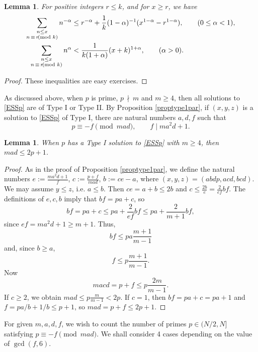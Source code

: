 \documentclass[12pt]{amsart}
\newtheorem{lemma}[theorem]{Lemma}
\theoremstyle{definition}
\theoremstyle{remark}
\numberwithin{equation}{section}
\begin{document}
\begin{lemma}
\label{lem3}
For positive integers $r\le k$, and for $x\ge r$, we have
\begin{align*}
\sum_{\substack{n\le x\\n\,\equiv\,r\kern-5pt\pmod k}}n^{-\alpha}
&\le r^{-\alpha}+\frac1k(1-\alpha)^{-1}(x^{1-\alpha}-r^{1-\alpha}), \qquad (0\le\alpha<1),\\
\sum_{\substack{n\le x\\n\,\equiv\,r\kern-5pt\pmod k}}n^\alpha
&<\frac1{k(1+\alpha)}(x+k)^{1+\alpha}, \qquad(\alpha>0).
\end{align*}

\end{lemma}
\begin{proof}
These  inequalities are easy exercises.
\end{proof}

As discussed above, when $p$ is prime, $p\,\nmid\, m$ and $m\ge 4$, then all solutions to \eqref{ESSp} 
are of Type I or Type II.  By Proposition \ref{proptype1par},  if $(x,y,z)$ is a solution to \eqref{ESSp} of Type I, there are natural numbers $a,d,f$ such that
$$
p\equiv -f \pmod{mad}, \qquad f\mid ma^2 d+1.
$$
\begin{lemma}\label{madub}
When $p$ has a Type I solution to \eqref{ESSp} with $m\ge4$, then $mad \le 2p+1$.
\end{lemma}
\begin{proof}
As in the proof of Proposition \ref{proptype1par}, we define the natural numbers
$e:=\frac{ma^2d+1}{f}$, $c:=\frac{p+f}{mad}$, $b:=ce-a$,
where
$
(x,y,z)=(abdp,acd,bcd).
$
We may assume $y\le z$, i.e. $a\le b$. Then $ce=a+b\le 2b$ and 
$c \le \frac{2b}{e} = \frac{2}{ef} bf$. 
The definitions of $e,c,b$ imply that $bf=pa+c$, so
$$ bf =pa+c \le pa +  \frac{2}{ef} bf \le pa + \frac{2}{m+1} bf,$$
since $ef=ma^2d+1\ge m+1$. Thus,
$$
bf \le pa \frac{m+1}{m-1}
$$
and, since $b\ge a$, 
$$
f\le p \frac{m+1}{m-1}.
$$
Now
$$
macd = p+f \le p\frac{2m}{m-1}.
$$
If $c\ge 2$, we obtain $mad \le p \frac{m}{m-1} < 2p$. If $c=1$, then $bf=pa+c=pa+1$ and $f=pa/b+1/b \le p+1$, so 
$mad=p+f\le 2p+1$. 
\end{proof}



For given $m,a,d,f$, we wish to count  the number of primes $p\in(N/2, N]$ satisfying $p\equiv - f \pmod{mad}$.  We shall consider 4 cases depending on the value of $\gcd(f,6)$.
\end{document}

